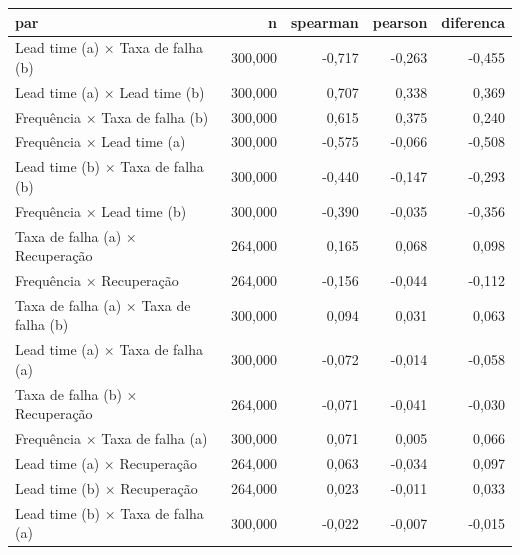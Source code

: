 \begin{tabular}{lrrrr}
\hline
par & n & spearman & pearson & diferenca \\
\hline
Lead time (a) × Taxa de falha (b) & 300,000 & -0,717 & -0,263 & -0,455 \\
Lead time (a) × Lead time (b) & 300,000 & 0,707 & 0,338 & 0,369 \\
Frequência × Taxa de falha (b) & 300,000 & 0,615 & 0,375 & 0,240 \\
Frequência × Lead time (a) & 300,000 & -0,575 & -0,066 & -0,508 \\
Lead time (b) × Taxa de falha (b) & 300,000 & -0,440 & -0,147 & -0,293 \\
Frequência × Lead time (b) & 300,000 & -0,390 & -0,035 & -0,356 \\
Taxa de falha (a) × Recuperação & 264,000 & 0,165 & 0,068 & 0,098 \\
Frequência × Recuperação & 264,000 & -0,156 & -0,044 & -0,112 \\
Taxa de falha (a) × Taxa de falha (b) & 300,000 & 0,094 & 0,031 & 0,063 \\
Lead time (a) × Taxa de falha (a) & 300,000 & -0,072 & -0,014 & -0,058 \\
Taxa de falha (b) × Recuperação & 264,000 & -0,071 & -0,041 & -0,030 \\
Frequência × Taxa de falha (a) & 300,000 & 0,071 & 0,005 & 0,066 \\
Lead time (a) × Recuperação & 264,000 & 0,063 & -0,034 & 0,097 \\
Lead time (b) × Recuperação & 264,000 & 0,023 & -0,011 & 0,033 \\
Lead time (b) × Taxa de falha (a) & 300,000 & -0,022 & -0,007 & -0,015 \\
\hline
\end{tabular}
